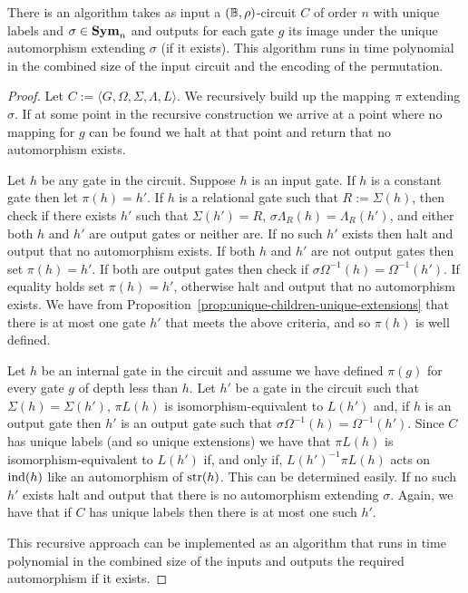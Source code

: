 \documentclass[../paper.tex]{subfiles}
\begin{document}
\begin{lem}
  There is an algorithm takes as input a $(\mathbb{B}, \rho)$-circuit $C$ of order $n$
  with unique labels and $\sigma \in \text{\textbf{Sym}}_n$ and outputs for each gate $g$ its
  image under the unique automorphism extending $\sigma$ (if it exists). This
  algorithm runs in time polynomial in the combined size of the input circuit
  and the encoding of the permutation.
  \label{lem:compute-automorphisms}
\end{lem}
\begin{proof}
  Let $C := \langle G, \Omega, \Sigma, \Lambda, L \rangle$. We recursively build
  up the mapping $\pi$ extending $\sigma$. If at some point in the recursive
  construction we arrive at a point where no mapping for $g$ can be found we
  halt at that point and return that no automorphism exists.

  Let $h$ be any gate in the circuit. Suppose $h$ is an input gate. If $h$ is a
  constant gate then let $\pi (h) = h'$. If $h$ is a relational gate such that
  $R := \Sigma(h)$, then check if there exists $h'$ such that $\Sigma (h') = R$,
  $\sigma \Lambda_R(h) = \Lambda_R(h')$, and either both $h$ and $h'$ are output
  gates or neither are. If no such $h'$ exists then halt and output that no
  automorphism exists. If both $h$ and $h'$ are not output gates then set $\pi
  (h) = h'$. If both are output gates then check if $\sigma \Omega^{-1}(h) =
  \Omega^{-1}(h')$. If equality holds set $\pi(h) = h'$, otherwise halt and
  output that no automorphism exists. We have from
  Proposition~\ref{prop:unique-children-unique-extensions} that there is at most
  one gate $h'$ that meets the above criteria, and so $\pi(h)$ is well defined.

  Let $h$ be an internal gate in the circuit and assume we have defined $\pi
  (g)$ for every gate $g$ of depth less than $h$. Let $h'$ be a gate in the
  circuit such that $\Sigma(h) = \Sigma (h')$, $\pi L(h)$ is
  isomorphism-equivalent to $L(h')$ and, if $h$ is an output gate then $h'$ is
  an output gate such that $\sigma \Omega^{-1}(h) = \Omega^{-1}(h')$. Since $C$
  has unique labels (and so unique extensions) we have that $\pi L(h)$ is
  isomorphism-equivalent to $L(h')$ if, and only if, $L(h')^{-1}\pi L(h)$ acts
  on $\text{\upshape ind}(h)$ like an automorphism of $\text{str}(h)$. This can be determined easily.
  If no such $h'$ exists halt and output that there is no automorphism extending
  $\sigma$. Again, we have that if $C$ has unique labels then there is at most
  one such $h'$.

  This recursive approach can be implemented as an algorithm that runs in time
  polynomial in the combined size of the inputs and outputs the required
  automorphism if it exists.
\end{proof}
\end{document}
